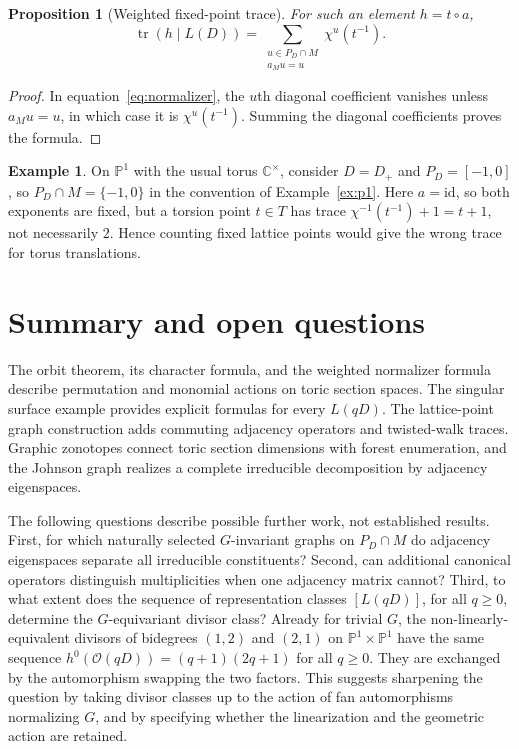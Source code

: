 \documentclass[12pt,letterpaper]{article}
\newtheorem{proposition}[theorem]{Proposition}
\theoremstyle{definition}
\newtheorem{example}[theorem]{Example}
\theoremstyle{remark}
\numberwithin{equation}{section}
\DeclareMathOperator{\tr}{tr}
\newcommand{\CC}{\mathbb C}
\newcommand{\calO}{\mathcal O}
\begin{document}
\begin{proposition}[Weighted fixed-point trace]\label{prop:weighted}
For such an element $h=t\circ a$,
\begin{equation}\label{eq:weighted}
\tr(h\mid L(D))=\sum_{\substack{u\in P_D\cap M\\a_Mu=u}}
\chi^u(t^{-1}).
\end{equation}
\end{proposition}
\begin{proof}
In equation~\eqref{eq:normalizer}, the $u$th diagonal coefficient vanishes unless $a_Mu=u$, in which case it is $\chi^u(t^{-1})$. Summing the diagonal coefficients proves the formula.
\end{proof}

\begin{example}
On $\mathbb P^1$ with the usual torus $\CC^\times$, consider $D=D_+$ and $P_D=[-1,0]$, so $P_D\cap M=\{-1,0\}$ in the convention of Example~\ref{ex:p1}. Here $a=\mathrm{id}$, so both exponents are fixed, but a torsion point $t\in T$ has trace $\chi^{-1}(t^{-1})+1=t+1$, not necessarily $2$. Hence counting fixed lattice points would give the wrong trace for torus translations.
\end{example}

\section{Summary and open questions}\label{sec:summary}
The orbit theorem, its character formula, and the weighted normalizer formula describe permutation and monomial actions on toric section spaces. The singular surface example provides explicit formulas for every $L(qD)$. The lattice-point graph construction adds commuting adjacency operators and twisted-walk traces. Graphic zonotopes connect toric section dimensions with forest enumeration, and the Johnson graph realizes a complete irreducible decomposition by adjacency eigenspaces.

The following questions describe possible further work, not established results. First, for which naturally selected $G$-invariant graphs on $P_D\cap M$ do adjacency eigenspaces separate all irreducible constituents? Second, can additional canonical operators distinguish multiplicities when one adjacency matrix cannot? Third, to what extent does the sequence of representation classes $[L(qD)]$, for all $q\geq0$, determine the $G$-equivariant divisor class? Already for trivial $G$, the non-linearly-equivalent divisors of bidegrees $(1,2)$ and $(2,1)$ on $\mathbb P^1\times\mathbb P^1$ have the same sequence $h^0(\calO(qD))=(q+1)(2q+1)$ for all $q\geq0$. They are exchanged by the automorphism swapping the two factors. This suggests sharpening the question by taking divisor classes up to the action of fan automorphisms normalizing $G$, and by specifying whether the linearization and the geometric action are retained.
\end{document}
